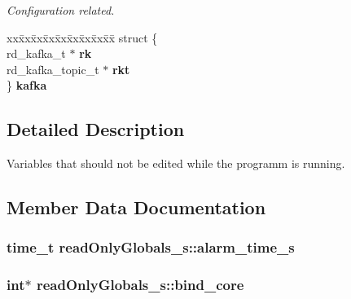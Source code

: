 \begin{DoxyCompactItemize}
\begin{tabbing}
\end{tabbing}\begin{DoxyCompactList}\small\item\em Configuration related. \end{DoxyCompactList}\item 
\begin{tabbing}
xx\=xx\=xx\=xx\=xx\=xx\=xx\=xx\=xx\=\kill
struct \{\\
\>rd\_kafka\_t $\ast$ {\bf rk}\\
\>rd\_kafka\_topic\_t $\ast$ {\bf rkt}\\
\} {\bf kafka}\\

\end{tabbing}\end{DoxyCompactItemize}


\subsection{Detailed Description}
Variables that should not be edited while the programm is running. 

\subsection{Member Data Documentation}
\subsubsection[{alarm\+\_\+time\+\_\+s}]{\setlength{\rightskip}{0pt plus 5cm}time\+\_\+t read\+Only\+Globals\+\_\+s\+::alarm\+\_\+time\+\_\+s}\label{structread_only_globals__s_adae234a83378cbd995aa5012a23da207}
\subsubsection[{bind\+\_\+core}]{\setlength{\rightskip}{0pt plus 5cm}int$\ast$ read\+Only\+Globals\+\_\+s\+::bind\+\_\+core}\label{structread_only_globals__s_a69ab72dfeeb9d9a277f0d3b0f37193c5}
